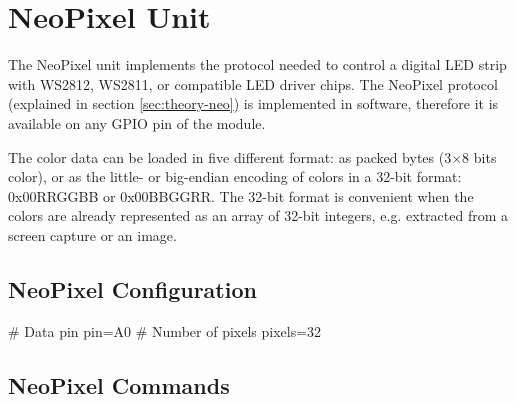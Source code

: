 \section{NeoPixel Unit}

The NeoPixel unit implements the protocol needed to control a digital \gls{LED} strip with WS2812, WS2811, or compatible \gls{LED} driver chips. The NeoPixel protocol (explained in section \ref{sec:theory-neo}) is implemented in software, therefore it is available on any \gls{GPIO} pin of the module.

The color data can be loaded in five different format: as packed bytes (3$\times$8 bits color), or as the little- or big-endian encoding of colors in a 32-bit format: 0x00RRGGBB or 0x00BBGGRR. The 32-bit format is convenient when the colors are already represented as an array of 32-bit integers, e.g. extracted from a screen capture or an image.

\subsection{NeoPixel Configuration}

\begin{inicode}
# Data pin
pin=A0
# Number of pixels
pixels=32
\end{inicode}

\subsection{NeoPixel Commands}

